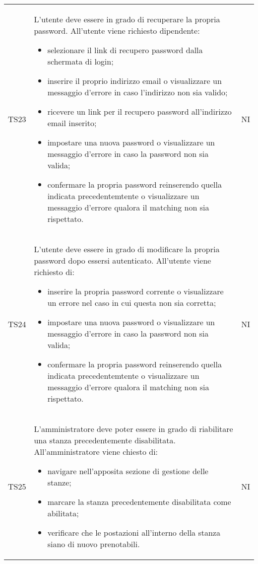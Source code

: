 {\begin{longtable}{ c C{11cm} c }
        TS23&
        \begin{flushleft}
            L'utente deve essere in grado di recuperare la propria password.
            All'utente viene richiesto dipendente:
        \end{flushleft}
        \begin{itemize}
            \item selezionare il link di recupero password dalla schermata di login;
            \item inserire il proprio indirizzo email o visualizzare un messaggio d'errore in caso l'indirizzo non sia valido;
            \item ricevere un link per il recupero password all'indirizzo email inserito;
            \item impostare una nuova password o visualizzare un messaggio d'errore in caso la password non sia valida;
            \item confermare la propria password reinserendo quella indicata precedentemtente o visualizzare un messaggio d'errore qualora il matching non sia rispettato.
        \end{itemize}&
        NI\\

        TS24&
        \begin{flushleft}
            L'utente deve essere in grado di modificare la propria password dopo essersi autenticato.
            All'utente viene richiesto di:
        \end{flushleft}
        \begin{itemize}
            \item inserire la propria password corrente o visualizzare un errore nel caso in cui questa non sia corretta;
            \item impostare una nuova password o visualizzare un messaggio d'errore in caso la password non sia valida;
            \item confermare la propria password reinserendo quella indicata precedentemtente o visualizzare un messaggio d'errore qualora il matching non sia rispettato.
        \end{itemize}&
        NI\\

        
        TS25&
        \begin{flushleft}
            L'amministratore deve poter essere in grado di riabilitare una stanza precedentemente disabilitata.
            All'amministratore viene chiesto di:
        \end{flushleft}
        \begin{itemize}
            \item navigare nell'apposita sezione di gestione delle stanze;
            \item marcare la stanza precedentemente disabilitata come abilitata;
            \item verificare che le postazioni all'interno della stanza siano di nuovo prenotabili.
        \end{itemize}&
        NI\\

     
        
    \end{longtable}
}